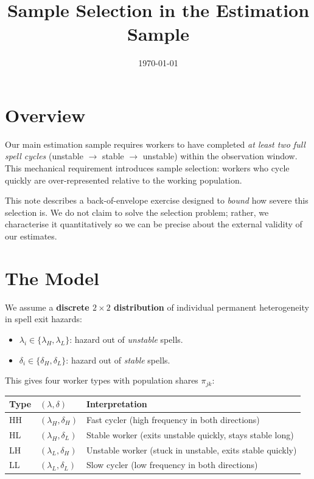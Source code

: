 \documentclass[12pt,a4paper]{article}
\title{\textbf{Sample Selection in the Estimation Sample}}
\date{\today}
\begin{document}
\maketitle

\section*{Overview}

Our main estimation sample requires workers to have completed \emph{at least two full
spell cycles} (unstable $\to$ stable $\to$ unstable) within the observation window. This
mechanical requirement introduces sample selection: workers who cycle quickly are
over-represented relative to the working population.

This note describes a back-of-envelope exercise designed to \emph{bound} how severe
this selection is. We do not claim to solve the selection problem; rather, we
characterise it quantitatively so we can be precise about the external validity of our
estimates.

\section{The Model}

We assume a \textbf{discrete $2\times 2$ distribution} of individual permanent
heterogeneity in spell exit hazards:
\begin{itemize}
    \item $\lambda_i \in \{\lambda_H, \lambda_L\}$: hazard out of \emph{unstable}
    spells.
    \item $\delta_i \in \{\delta_H, \delta_L\}$: hazard out of \emph{stable}
    spells.
\end{itemize}
This gives four worker types with population shares $\pi_{jk}$:

\begin{center}
\begin{tabular}{lll}
\toprule
Type & $(\lambda,\delta)$ & Interpretation\\
\midrule
HH & $(\lambda_H, \delta_H)$ & Fast cycler (high frequency in both directions)\\
HL & $(\lambda_H, \delta_L)$ & Stable worker (exits unstable quickly, stays stable long)\\
LH & $(\lambda_L, \delta_H)$ & Unstable worker (stuck in unstable, exits stable quickly)\\
LL & $(\lambda_L, \delta_L)$ & Slow cycler (low frequency in both directions)\\
\bottomrule
\end{tabular}
\end{center}
\end{document}
